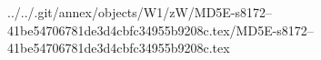 ../../.git/annex/objects/W1/zW/MD5E-s8172--41be54706781de3d4cbfc34955b9208c.tex/MD5E-s8172--41be54706781de3d4cbfc34955b9208c.tex